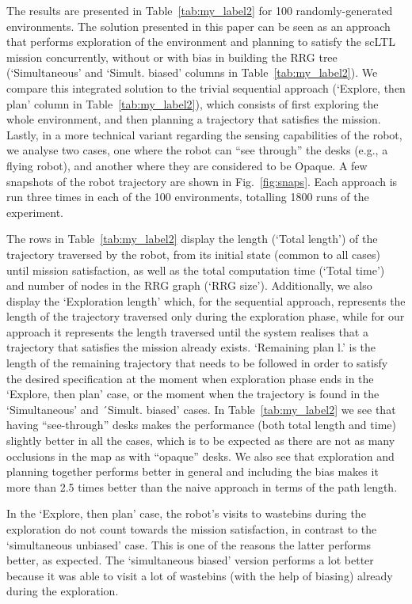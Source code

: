 The results are presented in Table~\ref{tab:my_label2} for 100 randomly-generated environments. 
The solution presented in this paper can be seen as an approach that performs exploration of the environment and planning to satisfy the scLTL mission concurrently, without or with bias in building the RRG tree (`Simultaneous' and `Simult. biased' columns in Table~\ref{tab:my_label2}). We compare this integrated solution to the trivial sequential approach (`Explore, then plan' column in Table~\ref{tab:my_label2}), which consists of first exploring the whole environment, and then planning a trajectory that satisfies the mission. Lastly, in a more technical variant regarding the sensing capabilities of the robot, we analyse two cases, one where the robot can ``see through'' the desks (e.g., a flying robot), and another where they are considered to be Opaque. A few snapshots of the robot trajectory are shown in Fig.~\ref{fig:snaps}. Each approach is run three times in each of the 100 environments, totalling 1800 runs of the experiment.


The rows in Table~\ref{tab:my_label2} display the length (`Total length') of the trajectory traversed by the robot, from its initial state (common to all cases) until mission satisfaction, as well as the total computation time (`Total time') and number of nodes in the RRG graph (`RRG size'). Additionally, we also display the `Exploration length' which, for the sequential approach, represents the length of the trajectory traversed only during the exploration phase, while for our approach it represents the length traversed until the system realises that a trajectory that satisfies the mission already exists. `Remaining plan l.' is the length of the remaining trajectory that needs to be followed in order to satisfy the desired specification at the moment when exploration phase ends in the `Explore, then plan' case, or the moment when the trajectory is found in the `Simultaneous' and ´Simult. biased' cases. In Table~\ref{tab:my_label2} we see that having ``see-through'' desks makes the performance (both total length and time) slightly better in all the cases, which is to be expected as there are not as many occlusions in the map as with ``opaque'' desks. 
We also see that exploration and planning together performs better in general and including the bias makes it more than 2.5 times better than the naive approach in terms of the path length.

In the `Explore, then plan' case, the robot's visits to wastebins during the exploration do not count towards the mission satisfaction, in contrast to the `simultaneous unbiased' case. This is one of the reasons the latter performs better, as expected. The `simultaneous biased' version performs a lot better because it was able to visit a lot of wastebins (with the help of biasing) already during the exploration.

